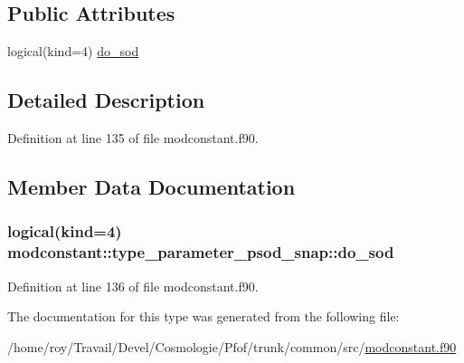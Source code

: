 \subsection*{Public Attributes}
\begin{DoxyCompactItemize}
\item 
logical(kind=4) \hyperlink{structmodconstant_1_1type__parameter__psod__snap_a271675ccb444048266be4a97bc3e3e6c}{do\+\_\+sod}
\end{DoxyCompactItemize}


\subsection{Detailed Description}


Definition at line 135 of file modconstant.\+f90.



\subsection{Member Data Documentation}
\subsubsection[{\texorpdfstring{do\+\_\+sod}{do_sod}}]{\setlength{\rightskip}{0pt plus 5cm}logical(kind=4) modconstant\+::type\+\_\+parameter\+\_\+psod\+\_\+snap\+::do\+\_\+sod}\hypertarget{structmodconstant_1_1type__parameter__psod__snap_a271675ccb444048266be4a97bc3e3e6c}{}\label{structmodconstant_1_1type__parameter__psod__snap_a271675ccb444048266be4a97bc3e3e6c}


Definition at line 136 of file modconstant.\+f90.



The documentation for this type was generated from the following file\+:\begin{DoxyCompactItemize}
\item 
/home/roy/\+Travail/\+Devel/\+Cosmologie/\+Pfof/trunk/common/src/\hyperlink{modconstant_8f90}{modconstant.\+f90}\end{DoxyCompactItemize}
